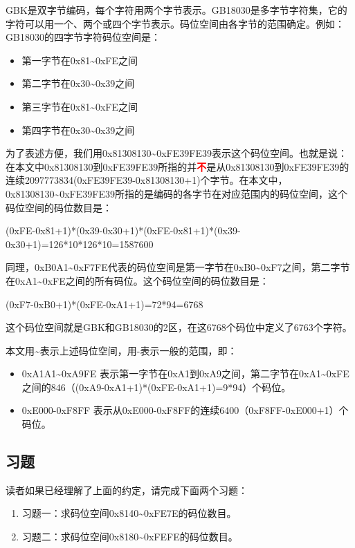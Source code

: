 \documentclass[cn,hazy,blue,14pt,screen]{elegantnote}
\begin{document}
GBK是双字节编码，每个字符用两个字节表示。GB18030是多字节字符集，它的字符可以用一个、两个或四个字节表示。码位空间由各字节的范围确定。例如：GB18030的四字节字符码位空间是：

\begin{itemize}

\item  第一字节在0x81\textasciitilde0xFE之间
\item  第二字节在0x30\textasciitilde0x39之间
\item  第三字节在0x81\textasciitilde0xFE之间
\item  第四字节在0x30\textasciitilde0x39之间
\end{itemize}

为了表述方便，我们用0x81308130\textasciitilde0xFE39FE39表示这个码位空间。也就是说：在本文中0x81308130到0xFE39FE39所指的并\textcolor{red}{\textbf{不}}是从0x81308130到0xFE39FE39的连续2097773834(0xFE39FE39-0x81308130+1)个字节。在本文中，0x81308130\textasciitilde0xFE39FE39所指的是编码的各字节在对应范围内的码位空间，这个码位空间的码位数目是：

(0xFE-0x81+1)*(0x39-0x30+1)*(0xFE-0x81+1)*(0x39-0x30+1)=126*10*126*10=1587600

同理，0xB0A1\textasciitilde0xF7FE代表的码位空间是第一字节在0xB0\textasciitilde0xF7之间，第二字节在0xA1\textasciitilde0xFE之间的所有码位。这个码位空间的码位数目是：

(0xF7-0xB0+1)*(0xFE-0xA1+1)=72*94=6768

这个码位空间就是GBK和GB18030的2区，在这6768个码位中定义了6763个字符。

本文用\textasciitilde 表示上述码位空间，用-表示一般的范围，即：

\begin{itemize}

\item
  0xA1A1\textasciitilde0xA9FE
  表示第一字节在0xA1到0xA9之间，第二字节在0xA1\textasciitilde0xFE之间的846（(0xA9-0xA1+1)*(0xFE-0xA1+1)=9*94）个码位。
\item
  0xE000-0xF8FF 表示从0xE000-0xF8FF的连续6400（0xF8FF-0xE000+1）个码位。
\end{itemize}


\subsection{习题\label{1.2}}

读者如果已经理解了上面的约定，请完成下面两个习题：

\begin{enumerate}

\item
  习题一：求码位空间0x8140\textasciitilde0xFE7E的码位数目。
\item
  习题二：求码位空间0x8180\textasciitilde0xFEFE的码位数目。
\end{enumerate}
\end{document}
